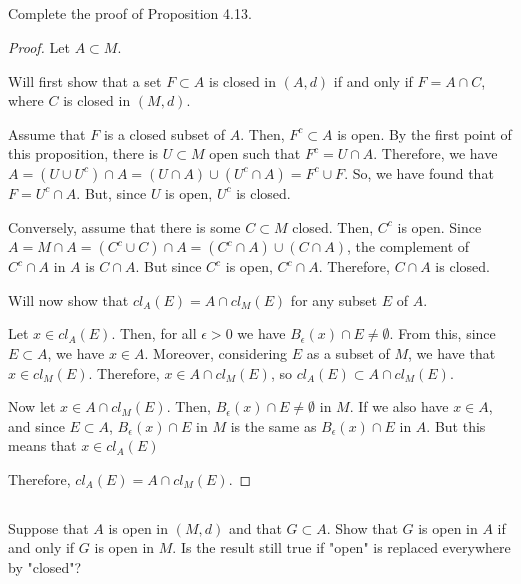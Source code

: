 
\subsection{} Complete the proof of Proposition 4.13.

\begin{proof}
Let $A \subset M$.

Will first show that a set $F \subset A$ is closed in $(A, d)$ if and only if $F = A \cap C$, where  $C$ is closed in $(M, d)$.

Assume that $F$ is a closed subset of $A$. Then, $F^c \subset A$ is open. By the first point of this proposition, there is $U \subset M$ open such that $F^c = U \cap A$. Therefore, we have $A = (U \cup U^c) \cap A = (U \cap A) \cup (U^c \cap A) = F^c \cup F$. So, we have found that $F = U^c \cap A$. But, since $U$ is open, $U^c$ is closed.

Conversely, assume that there is some $C \subset M$ closed. Then, $C^c$ is open. Since $A = M \cap A = (C^c \cup C) \cap A = (C^c \cap A) \cup (C \cap A)$, the complement of $C^c \cap A$ in $A$ is $C \cap A$. But since $C^c$ is open, $C^c \cap A$. Therefore, $C \cap A$ is closed.

\vspace{1em}

Will now show that $cl_A(E) = A \cap cl_M(E)$ for any subset $E$ of $A$.

Let $x \in cl_A(E)$. Then, for all $\epsilon > 0$ we have $B_\epsilon(x) \cap E \neq \emptyset$. From this, since $E \subset A$, we have $x \in A$. Moreover, considering $E$ as a subset of $M$, we have that $x \in cl_M(E)$. Therefore, $x \in A \cap cl_M(E)$, so $cl_A(E) \subset A \cap cl_M(E)$.

Now let $x \in A \cap cl_M(E)$. Then, $B_\epsilon(x) \cap E \neq \emptyset$ in $M$. If we also have $x \in A$, and since $E \subset A$, $B_\epsilon(x) \cap E$ in $M$ is the same as $B_\epsilon(x) \cap E$ in $A$. But this means that $x \in cl_A(E)$

Therefore, $cl_A(E) = A \cap cl_M(E)$.

\end{proof}

\subsection{} Suppose that $A$ is open in $(M, d)$ and that $G \subset A$. Show that $G$ is open in $A$ if and only if $G$ is open in $M$. Is the  result still true if "open" is replaced everywhere by "closed"?


